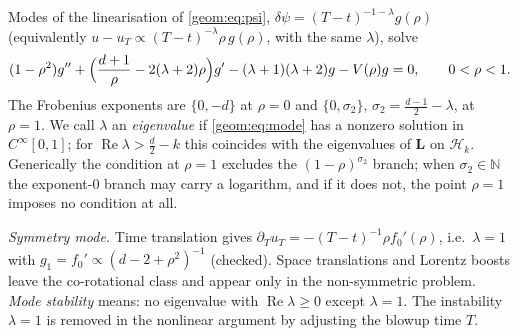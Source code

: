 Modes of the linearisation of \eqref{geom:eq:psi},
$\delta\psi=(T-t)^{-1-\lambda}g(\rho)$ (equivalently
$u-u_T\propto(T-t)^{-\lambda}\rho\,g(\rho)$, with the same $\lambda$), solve
\begin{equation}\label{geom:eq:mode}
  (1-\rho^2)g''+\Bigl(\frac{d+1}{\rho}-2(\lambda+2)\rho\Bigr)g'
  -(\lambda+1)(\lambda+2)g-V(\rho)g=0,\qquad 0<\rho<1 .
\end{equation}
The Frobenius exponents are $\{0,-d\}$ at $\rho=0$ and
$\{0,\sigma_2\}$, $\sigma_2=\frac{d-1}{2}-\lambda$, at $\rho=1$. We call
$\lambda$ an \emph{eigenvalue} if \eqref{geom:eq:mode} has a nonzero solution
in $C^\infty[0,1]$; for $\operatorname{Re}\lambda>\frac d2-k$ this coincides
with the eigenvalues of $\mathbf L$ on $\mathcal H_k$. Generically the
condition at $\rho=1$ excludes the $(1-\rho)^{\sigma_2}$ branch; when
$\sigma_2\in\mathbb N$ the exponent-$0$ branch may carry a logarithm, and if it
does not, the point $\rho=1$ imposes no condition at all.

\emph{Symmetry mode.} Time translation gives
$\partial_T u_T=-(T-t)^{-1}\rho f_0'(\rho)$, i.e.\ $\lambda=1$ with
$g_1=f_0'\propto(d-2+\rho^2)^{-1}$ (checked). Space translations and
Lorentz boosts leave the co-rotational class and appear only in the
non-symmetric problem. \emph{Mode stability} means: no eigenvalue with
$\operatorname{Re}\lambda\ge0$ except $\lambda=1$. The instability $\lambda=1$
is removed in the nonlinear argument by adjusting the blowup time $T$.

